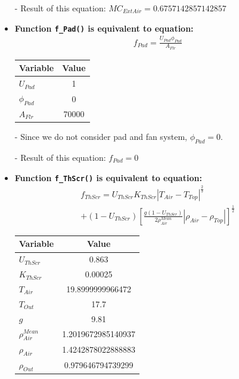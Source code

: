 \documentclass[a4paper]{article}
\numberwithin{equation}{section}
\begin{document}
\begin{itemize}
  \item[-] Result of this equation: \( MC_{ExtAir} = 0.6757142857142857 \)

  \item \textbf{Function \texttt{f\_Pad()} is equivalent to equation:}\label{fPad}
        \begin{align*}
          f_{Pad} = \frac{U_{Pad} \phi_{Pad}}{A_{Flr}}
        \end{align*}

        \begin{table}[H]
          \centering
          \begin{tabular}{@{}lS@{}}
            \toprule
            \textbf{Variable} & \textbf{Value} \\
            \midrule
            \( U_{Pad} \)       & 1              \\
            \( \phi_{Pad} \)    & 0              \\
            \( A_{Flr} \)       & 70000          \\
            \bottomrule
          \end{tabular}
        \end{table}
  \item[-] Since we do not consider pad and  fan system, \( \phi_{Pad} = 0 \).
  \item[-] Result of this equation: \( f_{Pad} = 0 \)

  \item \textbf{Function \texttt{f\_ThScr()} is equivalent to equation:}\label{fThScr}
        \begin{multline*}
          f_{ThScr} = U_{ThScr} K_{ThScr} |T_{Air} - T_{Top}|^{\frac{2}{3}} \\
          + (1 - U_{ThScr}) {\left[\frac{g(1 - U_{ThScr})}{2\rho^{Mean}_{Air}} |\rho_{Air} - \rho_{Top}|\right]}^{\frac{1}{2}}
        \end{multline*}

        \begin{table}[H]
          \centering
          \begin{tabular}{@{}lS[table-format=2.16]@{}}
            \toprule
            \textbf{Variable}     & \textbf{Value}     \\
            \midrule
            \( U_{ThScr} \)         & 0.863              \\
            \( K_{ThScr} \)         & 0.00025            \\
            \( T_{Air} \)           & 19.8999999966472   \\
            \( T_{Out} \)           & 17.7               \\
            \( g \)                 & 9.81               \\
            \( \rho^{Mean}_{Air} \) & 1.2019672985140937 \\
            \( \rho_{Air} \)        & 1.4242878022888883 \\
            \( \rho_{Out} \)        & 0.979646794739299  \\
            \bottomrule
          \end{tabular}
        \end{table}


\end{itemize}
\end{document}
